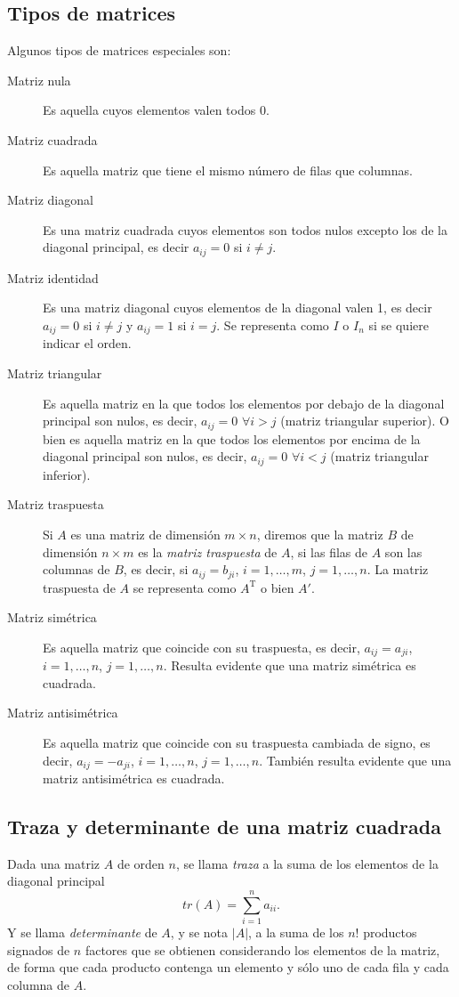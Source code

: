\documentclass[a4paper]{article}
\begin{document}
\subsection*{Tipos de matrices}
Algunos tipos de matrices especiales son:
\begin{description}
\item [Matriz nula] Es aquella cuyos elementos valen todos 0.
\item [Matriz cuadrada] Es aquella matriz que tiene el mismo número de filas que columnas.
\item [Matriz diagonal] Es una matriz cuadrada cuyos elementos son todos nulos excepto los
de la diagonal principal, es decir $a_{ij}=0$ si $i\neq j$.
\item [Matriz identidad] Es una matriz diagonal cuyos elementos de la diagonal valen 1, es decir
$a_{ij}=0$ si $i\neq j$ y $a_{ij}=1$ si $i=j$. Se representa como $I$ o $I_n$ si se quiere indicar el orden.
\item [Matriz triangular] Es aquella matriz en la que todos los elementos por debajo de la diagonal principal
son nulos, es decir, $a_{ij}=0$ $\forall i>j$ (matriz triangular superior). O bien es aquella matriz en la que todos los elementos por encima de la diagonal principal
son nulos, es decir, $a_{ij}=0$ $\forall i<j$ (matriz triangular inferior).
\item [Matriz traspuesta] Si $A$ es una matriz de dimensión $m\times n$, diremos que la matriz $B$ de dimensión $n\times m$ es la \emph{matriz traspuesta} de $A$, si las filas de $A$ son las columnas de $B$, es decir, si $a_{ij}=b_{ji}$, $i=1,\ldots,m$, $j=1,\ldots,n$. La matriz traspuesta de $A$ se representa como $A^\textrm{T}$ o bien $A'$.
\item [Matriz simétrica] Es aquella matriz que coincide con su traspuesta, es decir, $a_{ij}=a_{ji}$, $i=1,\ldots,n$, $j=1,\ldots,n$. Resulta evidente que una matriz simétrica es cuadrada.
\item [Matriz antisimétrica] Es aquella matriz que coincide con su traspuesta cambiada de signo, es decir, $a_{ij}=-a_{ji}$, $i=1,\ldots,n$, $j=1,\ldots,n$. También resulta evidente que una matriz antisimétrica es cuadrada. 
\end{description}

\subsection*{Traza y determinante de una matriz cuadrada}
Dada una matriz $A$ de orden $n$, se llama \emph{traza} a la suma de los elementos de la diagonal principal
\[
tr(A)=\sum_{i=1}^{n}a_{ii}.
\]
Y se llama \emph{determinante} de $A$, y se nota $|A|$, a la suma de los $n!$ productos signados de $n$ factores que se obtienen considerando los elementos de la matriz, de forma que cada producto contenga un elemento y sólo uno de cada fila y cada columna de $A$.
\end{document}
